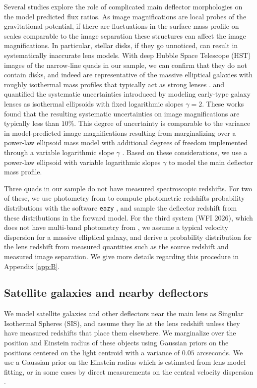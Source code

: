 Several studies \citep{EvansWitt03,Hsueh++16,Gilman++17,Hsueh++17,Hsueh++18} explore the role of complicated main deflector morphologies on the model predicted flux ratios. As image magnifications are local probes of the gravitational potential, if there are fluctuations in the surface mass profile on scales comparable to the image separation these structures can affect the image magnifications. In particular, stellar disks, if they go unnoticed, can result in systematically inaccurate lens models. With deep Hubble Space Telescope (HST) images of the narrow-line quads in our sample, we can confirm that they do not contain disks, and indeed are representative of the massive elliptical galaxies with roughly isothermal mass profiles that typically act as strong lenses \citep{Auger++10,Shankar++17}. \citet{Gilman++17} and \citet{Hsueh++18} quantified the systematic uncertainties introduced by modeling early-type galaxy lenses as isothermal ellipsoids with fixed logarithmic slopes $\gamma = 2$. These works found that the resulting systematic uncertainties on image magnifications are typically less than $10\%$. This degree of uncertainty is comparable to the variance in model-predicted image magnifications resulting from marginalizing over a power-law ellipsoid mass model with additional degrees of freedom implemented through a variable logarithmic slope $\gamma$ \citep{Nierenberg++19}. Based on these considerations, we use a power-law ellipsoid with variable logarithmic slopes $\gamma$ to model the main deflector mass profile.

Three quads in our sample do not have measured spectroscopic redshifts. For two of these, we use photometry from \citet{Shajib++18} to compute photometric redshifts probability distributions with the software {\tt{eazy}} \citep{Brammer++08}, and sample the deflector redshift from these distributions in the forward model. For the third system (WFI 2026), which does not have multi-band photometry from \citet{Shajib++18}, we assume a typical velocity dispersion for a massive elliptical galaxy, and derive a probability distribution for the lens redshift from measured quantities such as the source redshift and measured image separation. We give more details regarding this procedure in Appendix \ref{app:B}.    

\subsection{Satellite galaxies and nearby deflectors}
\label{ssec:satgals}
We model satellite galaxies and other deflectors near the main lens as Singular Isothermal Spheres (SIS), and assume they lie at the lens redshift unless they have measured redshifts that place them elsewhere. We marginalize over the position and Einstein radius of these objects using Gaussian priors on the positions centered on the light centroid with a variance of $0.05$ arcseconds. We use a Gaussian prior on the Einstein radius which is estimated from lens model fitting, or in some cases by direct measurements on the central velocity dispersion \citep[e.g.][]{Wong++17,Rusu++19}. 


